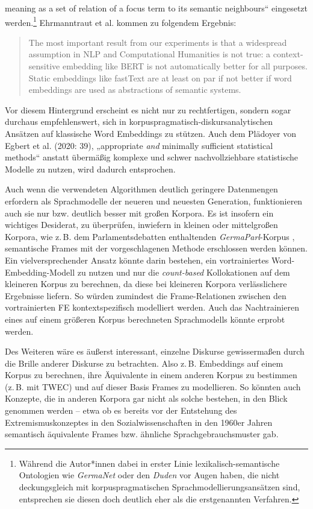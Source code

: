 meaning as a set of relation of a focus term to its semantic neighbours`` eingesetzt werden.\footnote{Während die Autor*innen dabei in erster Linie lexikalisch-semantische Ontologien wie \emph{GermaNet} oder den \emph{Duden} vor Augen haben, die nicht deckungsgleich mit korpuspragmatischen Sprachmodellierungsansätzen sind, entsprechen sie diesen doch deutlich eher als die erstgenannten Verfahren.} Ehrmanntraut et al. kommen zu folgendem Ergebnis:

\begin{quote}
The most important result from our experiments is that a widespread assumption in NLP and Computational Humanities is not true: a context-sensitive embedding like BERT is not automatically better for all purposes. Static embeddings like fastText are at least on par if not better if word embeddings are used as abstractions of semantic systems. \autocite[28]{ehrmanntrautTypeTokenbasedWord2021}
\end{quote}

Vor diesem Hintergrund erscheint es nicht nur zu rechtfertigen, sondern sogar durchaus empfehlenswert, sich in korpuspragmatisch-diskursanalytischen Ansätzen auf klassische Word Embeddings zu stützen. Auch dem Plädoyer von Egbert et al. (2020: 39), „appropriate \emph{and} minimally sufficient statistical methods`` anstatt übermäßig komplexe und schwer nachvollziehbare statistische Modelle zu nutzen, wird dadurch entsprochen.

Auch wenn die verwendeten Algorithmen deutlich geringere Datenmengen erfordern als Sprachmodelle der neueren und neuesten Generation, funktionieren auch sie nur bzw. deutlich besser mit großen Korpora. Es ist insofern ein wichtiges Desiderat, zu überprüfen, inwiefern in kleinen oder mittelgroßen Korpora, wie z.\,B. dem Parlamentsdebatten enthaltenden \emph{GermaParl}-Korpus \autocite{blaetteGermaParlCorpusPlenary2020}, semantische Frames mit der vorgeschlagenen Methode erschlossen werden können. Ein vielversprechender Ansatz könnte darin bestehen, ein vortrainiertes Word-Embedding-Modell zu nutzen und nur die \emph{count-based} Kollokationen auf dem kleineren Korpus zu berechnen, da diese bei kleineren Korpora verlässlichere Ergebnisse liefern. So würden zumindest die Frame-Relationen zwischen den vortrainierten FE kontextspezifisch modelliert werden. Auch das Nachtrainieren eines auf einem größeren Korpus berechneten Sprachmodells könnte erprobt werden.

Des Weiteren wäre es äußerst interessant, einzelne Diskurse gewissermaßen durch die Brille anderer Diskurse zu betrachten. Also z.\,B. Embeddings auf einem Korpus zu berechnen, ihre Äquivalente in einem anderen Korpus zu bestimmen (z.\,B. mit TWEC) und auf dieser Basis Frames zu modellieren. So könnten auch Konzepte, die in anderen Korpora gar nicht als solche bestehen, in den Blick genommen werden -- etwa ob es bereits vor der Entstehung des Extremismuskonzeptes in den Sozialwissenschaften in den 1960er Jahren semantisch äquivalente Frames bzw. ähnliche Sprachgebrauchsmuster gab.

